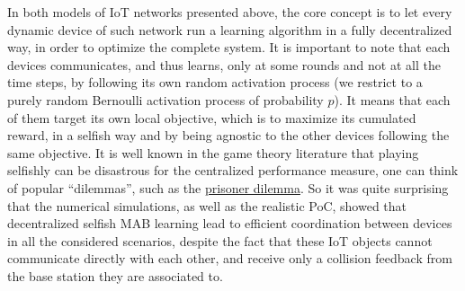 %
In both models of IoT networks presented above, the core concept is to let every dynamic device of such network run a learning algorithm in a fully decentralized way, in order to optimize the complete system.
It is important to note that each devices communicates, and thus learns, only at some rounds and not at all the time steps, by following its own random activation process (we restrict to a purely random Bernoulli activation process of probability $p$).
It means that each of them target its own local objective, which is to maximize its cumulated reward, in a selfish way and by being agnostic to the other devices following the same objective.
It is well known in the game theory literature that playing selfishly can be disastrous for the centralized performance measure, one can think of popular ``dilemmas'', such as the \href{https://en.wikipedia.org/wiki/Prisoner%27s_dilemma}{prisoner dilemma}.
So it was quite surprising that the numerical simulations, as well as the realistic PoC, showed that decentralized selfish MAB learning lead to efficient coordination between devices in all the considered scenarios, despite the fact that these IoT objects cannot communicate directly with each other, and receive only a collision feedback from the base station they are associated to.


